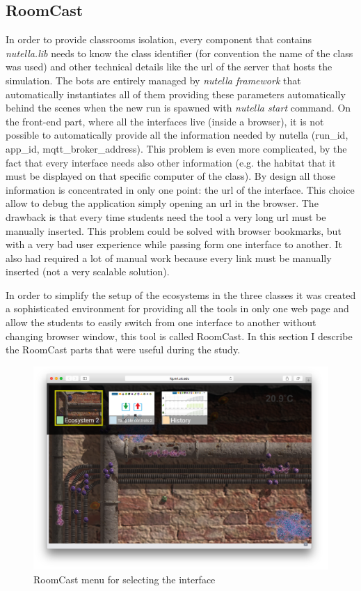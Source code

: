 \subsection{RoomCast}
In order to provide classrooms isolation, every component that contains \textit{nutella.lib} needs to know the class identifier (for convention the name of the class was used) and other technical details like the url of the server that hosts the simulation. The bots are entirely managed by \textit{nutella framework} that automatically instantiates all of them providing these parameters automatically behind the scenes when the new run is spawned with \textit{nutella start} command. On the front-end part, where all the interfaces live (inside a browser), it is not possible to automatically provide all the information needed by nutella (run\_id, app\_id, mqtt\_broker\_address). This problem is even more complicated, by the fact that every interface needs also other information (e.g. the habitat that it must be displayed on that specific computer of the class). By design all those information is concentrated in only one point: the url of the interface. This choice allow to debug the application simply opening an url in the browser. The drawback is that every time students need the tool a very long url must be manually inserted. This problem could be solved with browser bookmarks, but with a very bad user experience while passing form one interface to another. It also had required a lot of manual work because every link must be manually inserted (not a very scalable solution).

In order to simplify the setup of the ecosystems in the three classes it was created a sophisticated environment for providing all the tools in only one web page and allow the students to easily switch from one interface to another without changing browser window, this tool is called RoomCast. In this section I describe the RoomCast parts that were useful during the study.

\begin{figure}
\centering
\includegraphics[width=4.5in]{images/room-cast-menu.png}
\caption{RoomCast menu for selecting the interface}
\label{fig:roomcast_menu}
\end{figure}

